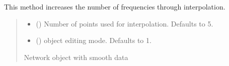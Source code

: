 \documentclass[letterpaper,10pt,english]{sphinxmanual}
\begin{document}
\begin{fulllineitems}
\begin{fulllineitems}
\label{\detokenize{touchstone:touchstone.spfile.interpolate}}
\pysigstartsignatures
{}
\pysigstopsignatures
\sphinxAtStartPar
This method increases the number of frequencies through interpolation.
\begin{quote}\begin{description}
\begin{itemize}
\item {}
\sphinxAtStartPar
{} (\sphinxstyleliteralemphasis{\sphinxupquote{, }}) \textendash{} Number of points used for interpolation. Defaults to 5.

\item {}
\sphinxAtStartPar
{} (\sphinxstyleliteralemphasis{\sphinxupquote{, }}) \textendash{} object editing mode. Defaults to \sphinxhyphen{}1.

\end{itemize}

\sphinxAtStartPar
Network object with smooth data

\sphinxAtStartPar
{\hyperref[\detokenize{touchstone:touchstone.spfile}]{}}

\end{description}\end{quote}

\end{fulllineitems}



\end{fulllineitems}
\end{document}
